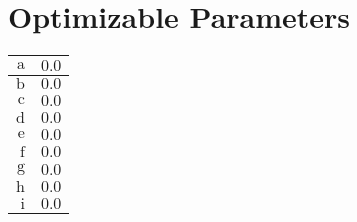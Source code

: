 \documentclass{article}
\begin{document}
\section*{Optimizable Parameters}
\begin{longtable}{|r|l|}
\hline
$\mathrm{a}$& $0.0$\\
\hline
$\mathrm{b}$& $0.0$\\
\hline
$\mathrm{c}$& $0.0$\\
\hline
$\mathrm{d}$& $0.0$\\
\hline
$\mathrm{e}$& $0.0$\\
\hline
$\mathrm{f}$& $0.0$\\
\hline
$\mathrm{g}$& $0.0$\\
\hline
$\mathrm{h}$& $0.0$\\
\hline
$\mathrm{i}$& $0.0$\\
\hline
\end{longtable}
\end{document}

